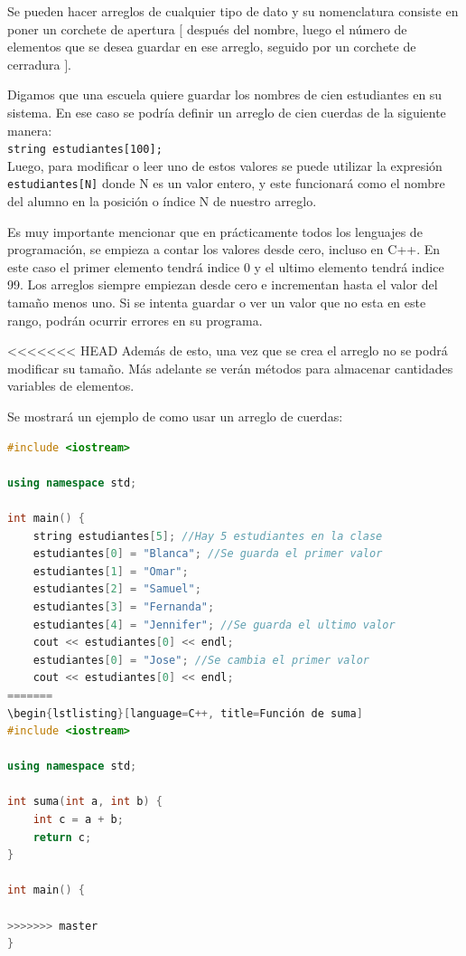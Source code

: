 \documentclass{article}
\begin{document}
Se pueden hacer arreglos de cualquier tipo de dato y su nomenclatura consiste en poner un corchete de apertura $[$ después del nombre, luego el número de elementos que se desea guardar en ese arreglo, seguido por un corchete de cerradura $]$.

Digamos que una escuela quiere guardar los nombres de cien estudiantes en su sistema. En ese caso se podría definir un arreglo de cien cuerdas de la siguiente manera: \\

\lstinline{string estudiantes[100];} \\

Luego, para modificar o leer uno de estos valores se puede utilizar la expresión \lstinline{estudiantes[N]} donde N es un valor entero, y este funcionará como el nombre del alumno en la posición o índice N de nuestro arreglo.

Es muy importante mencionar que en prácticamente todos los lenguajes de programación, se empieza a contar los valores desde cero, incluso en C++. En este caso el primer elemento tendrá indice 0 y el ultimo elemento tendrá indice 99. Los arreglos siempre empiezan desde cero e incrementan hasta el valor del tamaño menos uno. Si se intenta guardar o ver un valor que no esta en este rango, podrán ocurrir errores en su programa.

<<<<<<< HEAD
Además de esto, una vez que se crea el arreglo no se podrá modificar su tamaño. Más adelante se verán métodos para almacenar cantidades variables de elementos.

Se mostrará un ejemplo de como usar un arreglo de cuerdas:

\begin{lstlisting}[language=C++, title=Arreglo de cuerdas]
#include <iostream>

using namespace std;

int main() {
	string estudiantes[5]; //Hay 5 estudiantes en la clase
	estudiantes[0] = "Blanca"; //Se guarda el primer valor
	estudiantes[1] = "Omar";
	estudiantes[2] = "Samuel";
	estudiantes[3] = "Fernanda";
	estudiantes[4] = "Jennifer"; //Se guarda el ultimo valor
	cout << estudiantes[0] << endl;
	estudiantes[0] = "Jose"; //Se cambia el primer valor
	cout << estudiantes[0] << endl;
=======
\begin{lstlisting}[language=C++, title=Función de suma]
#include <iostream>

using namespace std;

int suma(int a, int b) {
	int c = a + b;
	return c;
}

int main() {

>>>>>>> master
}
\end{lstlisting}
\end{document}
